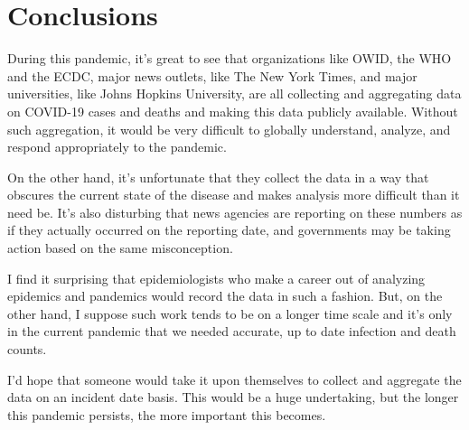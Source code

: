 \documentclass[10pt,reqno]{amsart}
\begin{document}
\section{Conclusions}
During this pandemic, it's great to see that organizations like OWID, the
WHO and the ECDC, major news outlets, like The New York Times, and
major universities, like Johns Hopkins University, are all collecting
and aggregating data on COVID-19 cases and deaths and making this data
publicly available.  Without such aggregation, it would be very
difficult to globally understand, analyze, and respond appropriately
to the pandemic.

On the other hand, it's unfortunate that they collect the data in a
way that obscures the current state of the disease and makes analysis
more difficult than it need be.  It's also disturbing that news
agencies are reporting on these numbers as if they actually occurred
on the reporting date, and governments may be taking action based on
the same misconception.

I find it surprising that epidemiologists who make a career out of
analyzing epidemics and pandemics would record the data in such a
fashion.  But, on the other hand, I suppose such work tends to be on a
longer time scale and it's only in the current pandemic that we needed
accurate, up to date infection and death counts.

I'd hope that someone would take it upon themselves to
collect and aggregate the data on an incident date basis.  This would
be a huge undertaking, but the longer this pandemic persists, the more
important this becomes.

\printbibliography
\end{document}
